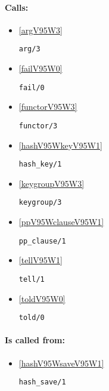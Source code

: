 \paragraph{Calls:} 
\begin{itemize}
\item \ref{argV95W3} 
\begin{verbatim}
arg/3
\end{verbatim}

\item \ref{failV95W0} 
\begin{verbatim}
fail/0
\end{verbatim}

\item \ref{functorV95W3} 
\begin{verbatim}
functor/3
\end{verbatim}

\item \ref{hashV95WkeyV95W1} 
\begin{verbatim}
hash_key/1
\end{verbatim}

\item \ref{keygroupV95W3} 
\begin{verbatim}
keygroup/3
\end{verbatim}

\item \ref{ppV95WclauseV95W1} 
\begin{verbatim}
pp_clause/1
\end{verbatim}

\item \ref{tellV95W1} 
\begin{verbatim}
tell/1
\end{verbatim}

\item \ref{toldV95W0} 
\begin{verbatim}
told/0
\end{verbatim}

\end{itemize}
\paragraph{Is called from:} 
\begin{itemize}
\item \ref{hashV95WsaveV95W1} 
\begin{verbatim}
hash_save/1
\end{verbatim}

\end{itemize}

